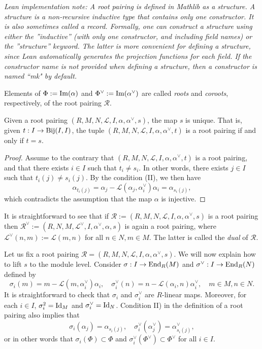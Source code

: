 {\it Lean implementation note: A root pairing is defined in Mathlib as a {\it structure}. A structure is a non-recursive inductive 
type that contains only one constructor. It is also sometimes called a {\it record}. Formally, one can construct a structure using either
the ''inductive'' (with only one constructor, and including field names) or the ''structure'' keyword. The latter is more convenient for defining a structure,
since Lean automatically generates the projection functions for each field. If the constructor name is not provided when defining a structure, then a 
constructor is named ``mk" by default.}

Elements of $\Phi := {\rm Im}(\alpha)$ and $\Phi^\vee := {\rm Im}(\alpha^\vee)$ are called {\it roots} and {\it coroots}, 
respectively, of the root pairing $\mathcal{R}$. 

\begin{lemma}
    Given a root pairing $(R,M,N,\mathcal{L},I,\alpha, \alpha^\vee, s)$, the map $s$ is unique. 
    That is, given $t : I \to {\rm Bij}(I,I)$, the tuple $(R,M,N,\mathcal{L},I,\alpha, \alpha^\vee, t)$
    is a root pairing if and only if $t = s$.
\end{lemma}
\begin{proof}
    Assume to the contrary that $(R,M,N,\mathcal{L},I,\alpha, \alpha^\vee, t)$ is a root pairing, and that 
    there exists $i \in I$ such that $t_i \neq s_i$. In other words, there exists $j \in I$ such that
    $t_i(j) \neq s_i(j)$. By the condition (II), we then have
    \[
        \alpha_{t_i(j)} = \alpha_j - \mathcal{L}(\alpha_j,\alpha^\vee_i)\alpha_i = \alpha_{s_i(j)},
    \]
    which contradicts the assumption that the map $\alpha$ is injective.
\end{proof}
\begin{remark}
    \label{def:dual-root-pairing}
    \leanok
It is straightforward to see that if $\mathcal{R} := (R,M,N,\mathcal{L},I,\alpha, \alpha^\vee,s)$ is 
a root pairing then $\mathcal{R}^\vee := (R,N,M,\mathcal{L}^\vee,I,\alpha^\vee, \alpha,s)$ is again 
a root pairing, where $\mathcal{L}^\vee (n,m) := \mathcal{L}(m,n)$ for all $n \in N,m \in M$. The 
latter is called the {\it dual} of $\mathcal{R}$.
\end{remark}

Let us fix a root pairing $\mathcal{R} = (R,M,N,\mathcal{L},I,\alpha, \alpha^\vee,s)$. We will now 
explain how to lift $s$ to the module level. Consider $\sigma: I \to {\rm End}_R(M)$ and 
$\sigma^\vee : I \to {\rm End}_R(N)$ defined by
\[
    \sigma_i(m) = m - \mathcal{L}(m,\alpha^\vee_i)\alpha_i, \quad \sigma^\vee_i(n) = n - \mathcal{L}(\alpha_i,n)\alpha^\vee_i, \quad m \in M, n \in N.
\]
It is straightforward to check that $\sigma_i$ and $\sigma^\vee_i$ are $R$-linear maps. Moreover, 
for each $i \in I$, $\sigma_i^2 = {\rm Id}_M$ and $\sigma_i^\vee = {\rm Id}_N$. Condition II) in the 
definition of a root pairing also implies that 
\[
    \sigma_i(\alpha_j) = \alpha_{s_i(j)}, \quad \sigma^\vee_i(\alpha^\vee_j) = \alpha^\vee_{s_i(j)},
\]
or in other words that $\sigma_i(\Phi) \subset \Phi$ and 
$\sigma_i^\vee(\Phi^\vee) \subset \Phi^\vee$ for all $i \in I$.

